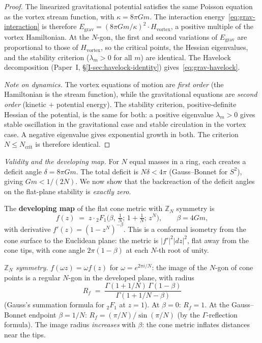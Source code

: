\begin{proof}
The linearized gravitational potential satisfies the same
Poisson equation as the vortex stream function, with
$\kappa = 8\pi Gm$.
The interaction energy~\eqref{eq:grav-interaction} is
therefore $E_{\mathrm{grav}} = (8\pi Gm/\kappa)^2
\cdot H_{\mathrm{vortex}}$,
a positive multiple of the vortex Hamiltonian.
At the $N$-gon, the first and second variations of
$E_{\mathrm{grav}}$ are proportional to those of
$H_{\mathrm{vortex}}$, so the critical points, the Hessian
eigenvalues, and the stability criterion
($\lambda_m > 0$ for all $m$) are identical.
The Havelock decomposition (Paper~I,
\S\ref{I-sec:havelock-identity}) gives~\eqref{eq:grav-havelock}.

\emph{Note on dynamics.}
The vortex equations of motion are \emph{first order}
(the Hamiltonian is the stream function), while the
gravitational equations are \emph{second order}
(kinetic $+$ potential energy).
The stability criterion, positive-definite Hessian of the
potential, is the same for both: a positive eigenvalue
$\lambda_m > 0$ gives stable oscillation in the
gravitational case and stable circulation in the vortex case.
A negative eigenvalue gives exponential growth in both.
The criterion $N \le N_{\mathrm{crit}}$ is therefore
identical.
\end{proof}

\emph{Validity and the developing map.}
For $N$ equal masses in a ring, each creates a deficit angle
$\delta = 8\pi Gm$.
The total deficit is $N\delta < 4\pi$ (Gauss--Bonnet for $S^2$),
giving $Gm < 1/(2N)$.
We now show that the backreaction of the deficit
angles on the flat-plane stability is \emph{exactly zero}.

The \textbf{developing map} of the flat cone metric with
$\mathbb{Z}_N$ symmetry is
\begin{equation}
  \label{eq:developing-map}
  f(z) \;=\; z \cdot {}_2F_1\!\bigl(\beta,\, \tfrac{1}{N};\,
    1 {+} \tfrac{1}{N};\, z^N\bigr),
  \qquad \beta = 4Gm,
\end{equation}
with derivative $f'(z) = (1 - z^N)^{-\beta}$.
This is a conformal isometry from the cone surface to the
Euclidean plane: the metric is $|f'|^2|dz|^2$, flat away
from the cone tips, with cone angle $2\pi(1{-}\beta)$ at
each $N$-th root of unity.

\emph{$\mathbb{Z}_N$ symmetry.}
$f(\omega z) = \omega f(z)$ for $\omega = e^{2\pi i/N}$:
the image of the $N$-gon of cone points is a regular $N$-gon
in the developed plane, with radius
\begin{equation}
  \label{eq:image-radius}
  R_f \;=\;
  \frac{\Gamma(1 + 1/N)\,\Gamma(1-\beta)}{\Gamma(1 + 1/N - \beta)}
\end{equation}
(Gauss's summation formula for ${}_2F_1$ at $z = 1$).
At $\beta = 0$: $R_f = 1$.
At the Gauss--Bonnet endpoint $\beta = 1/N$:
$R_f = (\pi/N)/\!\sin(\pi/N)$ (by the $\Gamma$-reflection
formula).
The image radius \emph{increases} with $\beta$: the cone metric
inflates distances near the tips.


